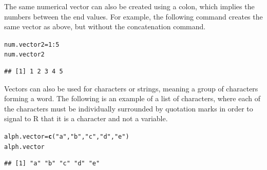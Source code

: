 \documentclass{report}\usepackage[]{graphicx}\usepackage[]{color}
\makeatletter
\newcommand{\hlnum}[1]{\textcolor[rgb]{0.686,0.059,0.569}{#1}}%
\newcommand{\hlstr}[1]{\textcolor[rgb]{0.192,0.494,0.8}{#1}}%
\newcommand{\hlopt}[1]{\textcolor[rgb]{0,0,0}{#1}}%
\newcommand{\hlstd}[1]{\textcolor[rgb]{0.345,0.345,0.345}{#1}}%
\newcommand{\hlkwb}[1]{\textcolor[rgb]{0.69,0.353,0.396}{#1}}%
\newcommand{\hlkwd}[1]{\textcolor[rgb]{0.737,0.353,0.396}{\textbf{#1}}}%
\newenvironment{kframe}{%
 \def\at@end@of@kframe{}%
 \ifinner\ifhmode%
  \def\at@end@of@kframe{\end{minipage}}%
  \begin{minipage}{\columnwidth}%
 \fi\fi%
 \def\FrameCommand##1{\hskip\@totalleftmargin \hskip-\fboxsep
 \colorbox{shadecolor}{##1}\hskip-\fboxsep
     \hskip-\linewidth \hskip-\@totalleftmargin \hskip\columnwidth}%
 \MakeFramed {\advance\hsize-\width
   \@totalleftmargin\z@ \linewidth\hsize
   \@setminipage}}%
 {\par\unskip\endMakeFramed%
 \at@end@of@kframe}
\newenvironment{knitrout}{}{} %
\makeatother
\begin{document}
The same numerical vector can also be created using a colon, which implies the numbers between the end values.  For example, the following command creates the same vector as above, but without the concatenation command.  

\begin{knitrout}
\color{fgcolor}\begin{kframe}
\begin{alltt}
\hlstd{num.vector2} \hlkwb{=} \hlnum{1}\hlopt{:}\hlnum{5}
\hlstd{num.vector2}
\end{alltt}
\begin{verbatim}
## [1] 1 2 3 4 5
\end{verbatim}
\end{kframe}
\end{knitrout}

Vectors can also be used for characters or strings, meaning a group of characters forming a word. The following is an example of a list of characters, where each of the characters must be individually surrounded by quotation marks in order to signal to \textsf{R} that it is a character and not a variable.  
\begin{knitrout}
\color{fgcolor}\begin{kframe}
\begin{alltt}
\hlstd{alph.vector} \hlkwb{=} \hlkwd{c}\hlstd{(}\hlstr{"a"}\hlstd{,} \hlstr{"b"}\hlstd{,} \hlstr{"c"}\hlstd{,} \hlstr{"d"}\hlstd{,} \hlstr{"e"}\hlstd{)}
\hlstd{alph.vector}
\end{alltt}
\begin{verbatim}
## [1] "a" "b" "c" "d" "e"
\end{verbatim}
\end{kframe}
\end{knitrout}
\end{document}
